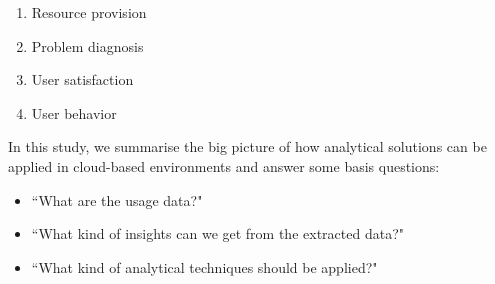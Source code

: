\begin{enumerate}
\item Resource provision
\item Problem diagnosis
\item User satisfaction
\item User behavior
	
\end{enumerate}

In this study, we summarise the big picture of how analytical solutions can be applied in cloud-based environments and answer some basis questions: 
\begin{itemize}
	\item ``What are the usage data?"
	\item ``What kind of insights can we get from the extracted data?"
	\item ``What kind of analytical techniques should be applied?"
\end{itemize}